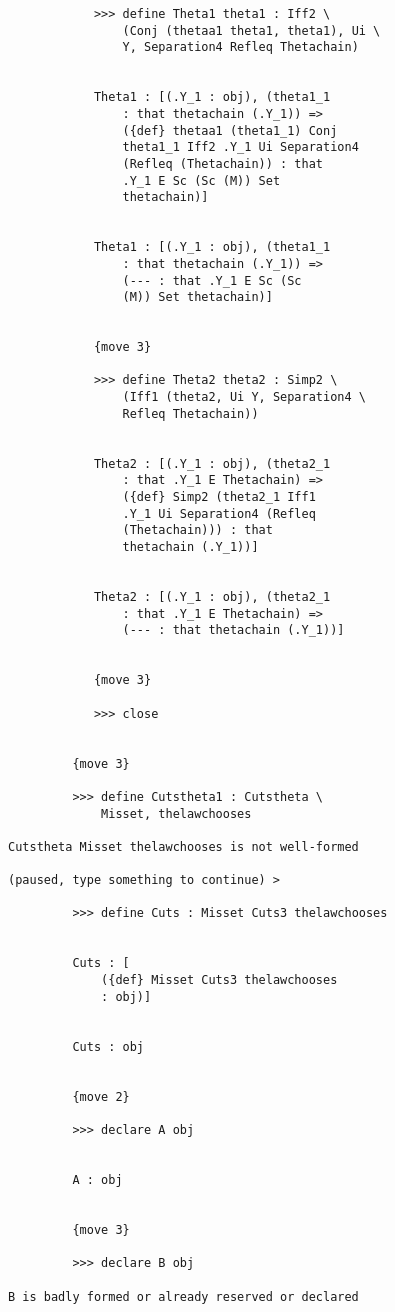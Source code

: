 \documentclass[12pt]{article}
\begin{document}
\begin{verbatim}
            >>> define Theta1 theta1 : Iff2 \
                (Conj (thetaa1 theta1, theta1), Ui \
                Y, Separation4 Refleq Thetachain)


            Theta1 : [(.Y_1 : obj), (theta1_1 
                : that thetachain (.Y_1)) => 
                ({def} thetaa1 (theta1_1) Conj 
                theta1_1 Iff2 .Y_1 Ui Separation4 
                (Refleq (Thetachain)) : that 
                .Y_1 E Sc (Sc (M)) Set 
                thetachain)]


            Theta1 : [(.Y_1 : obj), (theta1_1 
                : that thetachain (.Y_1)) => 
                (--- : that .Y_1 E Sc (Sc 
                (M)) Set thetachain)]


            {move 3}

            >>> define Theta2 theta2 : Simp2 \
                (Iff1 (theta2, Ui Y, Separation4 \
                Refleq Thetachain))


            Theta2 : [(.Y_1 : obj), (theta2_1 
                : that .Y_1 E Thetachain) => 
                ({def} Simp2 (theta2_1 Iff1 
                .Y_1 Ui Separation4 (Refleq 
                (Thetachain))) : that 
                thetachain (.Y_1))]


            Theta2 : [(.Y_1 : obj), (theta2_1 
                : that .Y_1 E Thetachain) => 
                (--- : that thetachain (.Y_1))]


            {move 3}

            >>> close


         {move 3}

         >>> define Cutstheta1 : Cutstheta \
             Misset, thelawchooses

Cutstheta Misset thelawchooses is not well-formed

(paused, type something to continue) >

         >>> define Cuts : Misset Cuts3 thelawchooses


         Cuts : [
             ({def} Misset Cuts3 thelawchooses 
             : obj)]


         Cuts : obj


         {move 2}

         >>> declare A obj


         A : obj


         {move 3}

         >>> declare B obj

B is badly formed or already reserved or declared


\end{verbatim}
\end{document}
